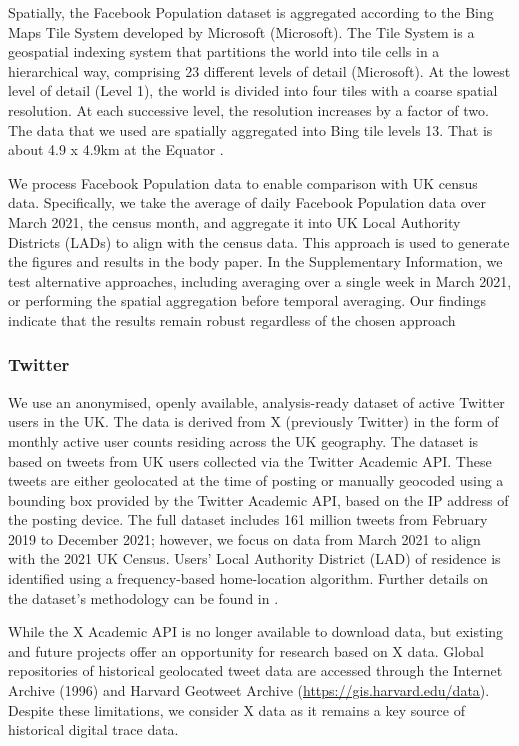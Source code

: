 \documentclass[]{rsos}%
\begin{document}
Spatially, the Facebook Population dataset is aggregated according to
the Bing Maps Tile System developed by Microsoft (Microsoft). The Tile
System is a geospatial indexing system that partitions the world into
tile cells in a hierarchical way, comprising 23 different levels of
detail (Microsoft). At the lowest level of detail (Level 1), the world
is divided into four tiles with a coarse spatial resolution. At each
successive level, the resolution increases by a factor of two. The data
that we used are spatially aggregated into Bing tile levels 13. That is
about 4.9 x 4.9km at the Equator \citep{maas2019}.

We process Facebook Population data to enable comparison with UK census
data. Specifically, we take the average of daily Facebook Population
data over March 2021, the census month, and aggregate it into UK Local
Authority Districts (LADs) to align with the census data. This approach
is used to generate the figures and results in the body paper. In the
Supplementary Information, we test alternative approaches, including
averaging over a single week in March 2021, or performing the spatial
aggregation before temporal averaging. Our findings indicate that the
results remain robust regardless of the chosen approach

\subsubsection{Twitter}\label{twitter}

We use an anonymised, openly available, analysis-ready dataset of active
Twitter users in the UK. The data is derived from X (previously Twitter)
in the form of monthly active user counts residing across the UK
geography. The dataset is based on tweets from UK users \citep{wang2022}
collected via the Twitter Academic API. These tweets are either
geolocated at the time of posting or manually geocoded using a bounding
box provided by the Twitter Academic API, based on the IP address of the
posting device. The full dataset includes 161 million tweets from
February 2019 to December 2021; however, we focus on data from March
2021 to align with the 2021 UK Census. Users' Local Authority District
(LAD) of residence is identified using a frequency-based home-location
algorithm. Further details on the dataset's methodology can be found in
\citep{wang2022} .

While the X Academic API is no longer available to download data, but
existing and future projects offer an opportunity for research based on
X data. Global repositories of historical geolocated tweet data are
accessed through the Internet Archive (1996) and Harvard Geotweet
Archive (\url{https://gis.harvard.edu/data}). Despite these limitations, we
consider X data as it remains a key source of historical digital trace
data.
\end{document}
